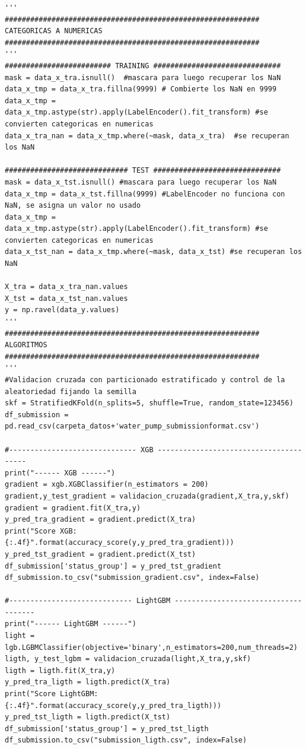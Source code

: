 \begin{lstlisting}[frame=single]
'''
############################################################
CATEGORICAS A NUMERICAS
############################################################
'''
######################### TRAINING ##############################
mask = data_x_tra.isnull()  #mascara para luego recuperar los NaN
data_x_tmp = data_x_tra.fillna(9999) # Combierte los NaN en 9999
data_x_tmp = data_x_tmp.astype(str).apply(LabelEncoder().fit_transform) #se convierten categoricas en numericas
data_x_tra_nan = data_x_tmp.where(~mask, data_x_tra)  #se recuperan los NaN

############################# TEST ##############################
mask = data_x_tst.isnull() #mascara para luego recuperar los NaN
data_x_tmp = data_x_tst.fillna(9999) #LabelEncoder no funciona con NaN, se asigna un valor no usado
data_x_tmp = data_x_tmp.astype(str).apply(LabelEncoder().fit_transform) #se convierten categoricas en numericas
data_x_tst_nan = data_x_tmp.where(~mask, data_x_tst) #se recuperan los NaN

X_tra = data_x_tra_nan.values
X_tst = data_x_tst_nan.values
y = np.ravel(data_y.values)
'''
############################################################
ALGORITMOS
############################################################
'''
#Validacion cruzada con particionado estratificado y control de la aleatoriedad fijando la semilla
skf = StratifiedKFold(n_splits=5, shuffle=True, random_state=123456)
df_submission = pd.read_csv(carpeta_datos+'water_pump_submissionformat.csv')

#------------------------------ XGB ---------------------------------------
print("------ XGB ------")
gradient = xgb.XGBClassifier(n_estimators = 200)
gradient,y_test_gradient = validacion_cruzada(gradient,X_tra,y,skf)
gradient = gradient.fit(X_tra,y)
y_pred_tra_gradient = gradient.predict(X_tra)
print("Score XGB: {:.4f}".format(accuracy_score(y,y_pred_tra_gradient)))
y_pred_tst_gradient = gradient.predict(X_tst)
df_submission['status_group'] = y_pred_tst_gradient
df_submission.to_csv("submission_gradient.csv", index=False)

#----------------------------- LightGBM -------------------------------------
print("------ LightGBM ------")
light = lgb.LGBMClassifier(objective='binary',n_estimators=200,num_threads=2)
ligth, y_test_lgbm = validacion_cruzada(light,X_tra,y,skf)
ligth = ligth.fit(X_tra,y)
y_pred_tra_ligth = ligth.predict(X_tra)
print("Score LightGBM: {:.4f}".format(accuracy_score(y,y_pred_tra_ligth)))
y_pred_tst_ligth = ligth.predict(X_tst)
df_submission['status_group'] = y_pred_tst_ligth
df_submission.to_csv("submission_ligth.csv", index=False)
	\end{lstlisting}
	
